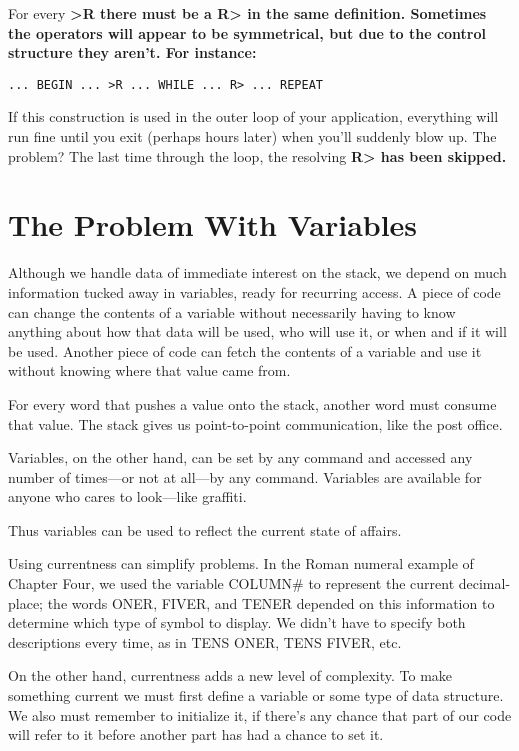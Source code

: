 For every \bf{>R} there must be a \bf{R>} in the same definition. Sometimes
the operators will appear to be symmetrical, but due to the control structure
they aren't. For instance:

\begin{verbatim}
... BEGIN ... >R ... WHILE ... R> ... REPEAT
\end{verbatim}

If this construction is used in the outer loop of your application,
everything will run fine until you exit (perhaps hours later) when you'll
suddenly blow up. The problem? The last time through the loop, the
resolving \bf{R>} has been skipped.

\section{The Problem With Variables}

Although we handle data of immediate interest on the stack, we depend
on much information tucked away in variables, ready for recurring access.
A piece of code can change the contents of a variable without
necessarily having to know anything about how that data will be used,
who will use it, or when and if it will be used. Another piece of code can
fetch the contents of a variable and use it without knowing where that
value came from.

For every word that pushes a value onto the stack, another word
must consume that value. The stack gives us point-to-point communication,
like the post office.

Variables, on the other hand, can be set by any command and accessed
any number of times---or not at all---by any command. Variables
are available for anyone who cares to look---like graffiti.

Thus variables can be used to reflect the current state of affairs.

Using currentness can simplify problems. In the Roman numeral example
of Chapter Four, we used the variable COLUMN# to represent the
current decimal-place; the words ONER, FIVER, and TENER depended
on this information to determine which type of symbol to display. We
didn't have to specify both descriptions every time, as in TENS ONER,
TENS FIVER, etc.

On the other hand, currentness adds a new level of complexity. To
make something current we must first define a variable or some type of
data structure. We also must remember to initialize it, if there's any
chance that part of our code will refer to it before another part has had a
chance to set it.

